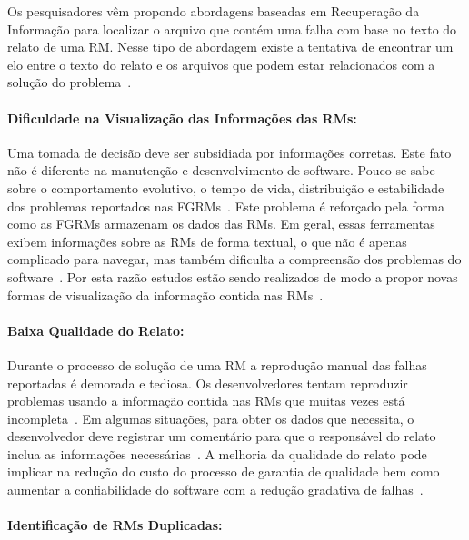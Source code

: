 Os pesquisadores vêm propondo abordagens baseadas em Recuperação da Informação
para localizar o arquivo que contém uma falha com base no texto do relato de
uma RM\@. Nesse tipo de abordagem existe a tentativa de encontrar um elo entre
o texto do relato e os arquivos que podem estar relacionados com a solução do
problema~\cite{Wong:2014:BBF:2705615.2706096}.

\paragraph{Dificuldade na Visualização das Informações das RMs:}

Uma tomada de decisão deve ser subsidiada por informações corretas. Este fato
não é diferente na manutenção e desenvolvimento de software. Pouco se sabe sobre
o comportamento evolutivo, o tempo de vida, distribuição e estabilidade dos
problemas reportados nas FGRMs~\cite{hora2012bug}. Este problema é reforçado
pela forma como as FGRMs armazenam os dados das RMs. Em geral, essas ferramentas
exibem informações sobre as RMs de forma textual, o que não é apenas complicado
para navegar, mas também dificulta a compreensão dos problemas do
software~\cite{dal2014bug}. Por esta razão estudos estão sendo realizados de
modo a propor novas formas de visualização da informação contida nas
RMs~\cite{takama2013application,hora2012bug}.

\paragraph{Baixa Qualidade do Relato:}

Durante o processo de solução de uma RM a reprodução manual das falhas
reportadas é demorada e tediosa. Os desenvolvedores tentam reproduzir problemas
usando a informação contida nas RMs que muitas vezes está
incompleta~\cite{White:2015:GRR:2820282.2820291}. Em algumas situações, para
obter os dados que necessita, o desenvolvedor deve registrar um comentário para
que o responsável do relato inclua as informações necessárias~\cite{5070993}. A
melhoria da qualidade do relato pode implicar na redução do custo do processo de
garantia de qualidade bem como aumentar a confiabilidade do software com a
redução gradativa de falhas~\cite{Tu:2014:MQI:2677832.2677844}.

\paragraph{Identificação de RMs Duplicadas:}


